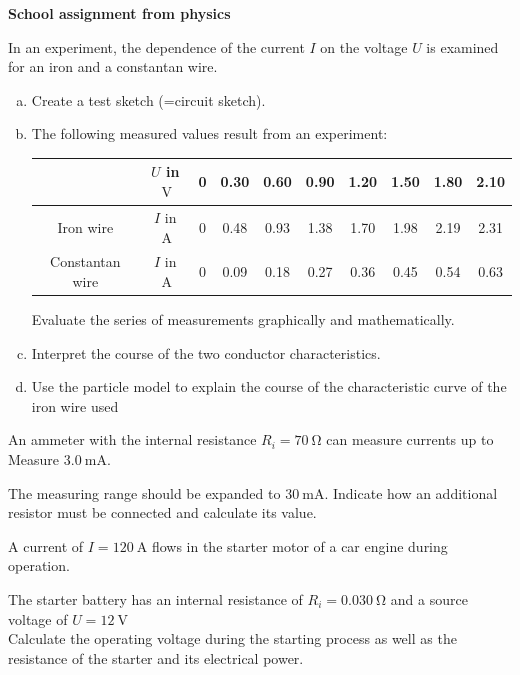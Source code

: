 \documentclass[a4paper]{article}
\begin{document}
	{\bf School assignment from physics }\\
	\begin{enumerate}[1.]
		
		{\bf \item In an experiment, the dependence of the current $I$ on the voltage $U$ is examined for an iron and a constantan wire.}
		
		\begin{enumerate}[a)]
			\item Create a test sketch (=circuit sketch).
			\item The following measured values result from an experiment:
			
			\hspace{15 pt}
			
			\begin{tabular}{c|c|c|c|c|c|c|c|c|c}
				& $U$ in $\SI{}{\volt}$ & 0 & 0.30 & 0.60 & 0.90 & 1.20 & 1.50 & 1.80 & 2.10 \\
				\hline
				Iron wire & $I$ in $\SI{}{\ampere}$ & 0 & 0.48 & 0.93 & 1.38 & 1.70 & 1.98 & 2.19 & 2.31 \\
				Constantan wire & $I$ in $\SI{}{\ampere}$ & 0 & 0.09 & 0.18 & 0.27 & 0.36 & 0.45 & 0.54 & 0.63
			\end{tabular}
			
			\hspace{15 pt}
			
			Evaluate the series of measurements graphically and mathematically.
			\item Interpret the course of the two conductor characteristics.
			\item Use the particle model to explain the course of the characteristic curve of the iron wire used
		\end{enumerate}
		
		{\bf \item An ammeter with the internal resistance $R_i=\SI{70}{\ohm}$ can measure currents up to
			Measure $\SI{3,0}{\milli\ampere}$.} The measuring range should be expanded to $\SI{30}{\milli\ampere}$. Indicate how an additional resistor must be connected and calculate its value.
		
		{\bf \item A current of $I=\SI{120}{\ampere}$ flows in the starter motor of a car engine during operation.} The starter battery has an internal resistance of $R_i=\SI{0.030}{\ohm}$ and a source voltage of $U=\SI{12}{\volt}$\\
		Calculate the operating voltage during the starting process as well as the resistance of the starter and its electrical power.
		

\end{enumerate}
\end{document}
